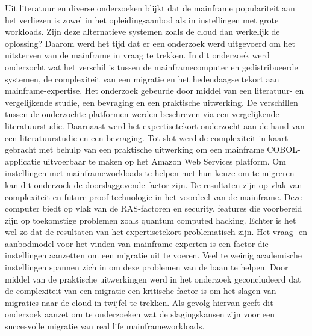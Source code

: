 Uit literatuur en diverse onderzoeken blijkt dat de mainframe populariteit aan het verliezen is zowel in het opleidingsaanbod als in instellingen met grote workloads. Zijn deze alternatieve systemen zoals de cloud dan werkelijk de oplossing? Daarom werd het tijd dat er een onderzoek werd uitgevoerd om het uitsterven van de mainframe in vraag te trekken. In dit onderzoek werd onderzocht wat het verschil is tussen de mainframecomputer en gedistribueerde systemen, de complexiteit van een migratie en het hedendaagse tekort aan mainframe-expertise. Het onderzoek gebeurde door middel van een literatuur- en vergelijkende studie, een bevraging en een praktische uitwerking. De verschillen tussen de onderzochte platformen werden beschreven via een vergelijkende literatuurstudie. Daarnaast werd het expertisetekort onderzocht aan de hand van een literatuurstudie en een bevraging. Tot slot werd de complexiteit in kaart gebracht met behulp van een praktische uitwerking om een mainframe COBOL-applicatie uitvoerbaar te maken op het Amazon Web Services platform. Om instellingen met mainframeworkloads te helpen met hun keuze om te migreren kan dit onderzoek de doorslaggevende factor zijn. De resultaten zijn op vlak van complexiteit en future proof-technologie in het voordeel van de mainframe. Deze computer biedt op vlak van de RAS-factoren en security, features die voorbereid zijn op toekomstige problemen zoals quantum computed hacking. Echter is het wel zo dat de resultaten van het expertisetekort problematisch zijn. Het vraag- en aanbodmodel voor het vinden van mainframe-experten is een factor die instellingen aanzetten om een migratie uit te voeren. Veel te weinig academische instellingen spannen zich in om deze problemen van de baan te helpen. Door middel van de praktische uitwerkingen werd in het onderzoek geconcludeerd dat de complexiteit van een migratie een kritische factor is om het slagen van migraties naar de cloud in twijfel te trekken. Als gevolg hiervan geeft dit onderzoek aanzet om te onderzoeken wat de slagingskansen zijn voor een succesvolle migratie van real life mainframeworkloads. 